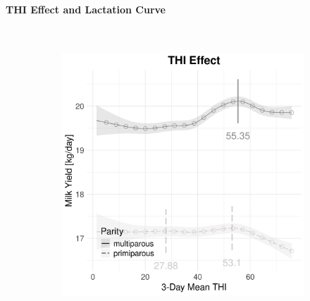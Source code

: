 \newpage
\paragraph{THI Effect and Lactation Curve} \quad \\
\begin{figure}[H]
    \centering
    \begin{subfigure}[b]{0.45\textwidth}
        \centering
        \includegraphics[width=\textwidth]{thesis/figures/models/milk/after2010/si_milk_after2010/si_milk_after2010_marginal_thi_milk_combined.png}
    \end{subfigure}
    \hspace{0.05\textwidth} %
    \begin{subfigure}[b]{0.45\textwidth}
        \centering

\end{subfigure}
\end{figure}
